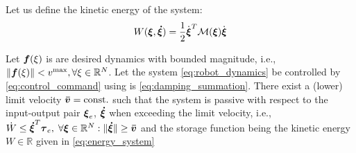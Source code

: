 Let us define the kinetic energy of the system:
\begin{equation}
	W(\vecs \xi, \vecs{\dot \xi}) = \frac{1}{2}  \dot{\vecs{\xi}}^T \matd{M}(\vecs \xi) \dot{\vecs{\xi}} \label{eq:energy_system}
\end{equation}

\begin{theorem} \label{theorem:passivity}
  Let $\boldsymbol{f}(\xi)$ is are desired dynamics with bounded magnitude, i.e., $\| \boldsymbol{f}(\xi) \| < v^{\mathrm{max}}, \forall \xi \in \mathbb{R}^N$.
  Let the system \eqref{eq:robot_dynamics} be controlled by \eqref{eq:control_command} using is \eqref{eq:damping_summation}.
  There exist a (lower) limit velocity $\boldsymbol{\bar v} = \text{const.}$ such that the system is passive with respect to the input-output pair $\boldsymbol{\xi}_e$, $\boldsymbol{\dot \xi}$ when exceeding the limit velocity, i.e., $\dot{W} \leq \boldsymbol{\dot \xi}^T \boldsymbol{\tau}_e, \; \forall \boldsymbol{\xi} \in \mathbb{R}^N: \| \boldsymbol{\dot \xi} \| \geq \boldsymbol{\bar v}$ and the storage function being the kinetic energy $W \in \mathbb{R}$ given in \eqref{eq:energy_system}
\end{theorem}
  
